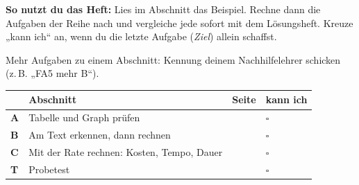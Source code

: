 \documentclass[11pt]{article}
\begin{document}
\par\smallskip
{}\par\medskip
\noindent\textbf{So nutzt du das Heft:} Lies im Abschnitt das Beispiel. Rechne dann die Aufgaben der Reihe nach und vergleiche jede sofort mit dem Lösungsheft. Kreuze „kann ich“ an, wenn du die letzte Aufgabe (\emph{Ziel}) allein schaffst.\par
\noindent Mehr Aufgaben zu einem Abschnitt: Kennung deinem Nachhilfelehrer schicken (z.\,B. „FA5 mehr B“).\par\medskip
{\renewcommand{\arraystretch}{1.3}
\noindent\begin{tabular}{|>{\bfseries}p{10mm}|p{112mm}|>{\raggedleft\arraybackslash}p{10mm}|>{\centering\arraybackslash}p{14mm}|}\hline
\rowcolor{black!8} & \textbf{Abschnitt} & \textbf{Seite} & \textbf{kann ich}\\\hline
A & Tabelle und Graph prüfen & \pageref{s:A} & $\square$\\\hline
B & Am Text erkennen, dann rechnen & \pageref{s:B} & $\square$\\\hline
C & Mit der Rate rechnen: Kosten, Tempo, Dauer & \pageref{s:C} & $\square$\\\hline
T & Probetest & \pageref{s:T} & $\square$\\\hline
\end{tabular}}\par\bigskip
\end{document}
